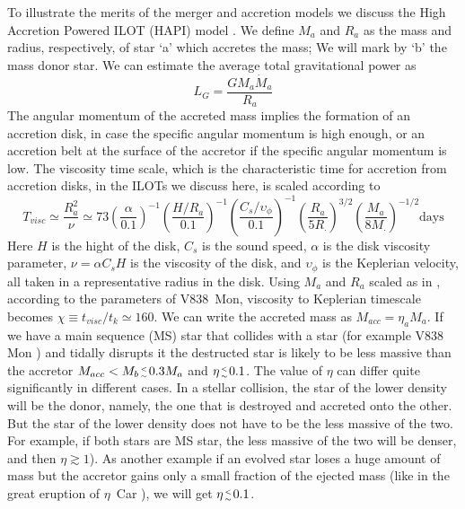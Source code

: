 \documentclass[a4paper,modern]{aastex62}
\newcommand{\lesim}{\genfrac{}{}{0pt}{2}{<}{\sim}}
\begin{document}
To illustrate the merits of the merger and accretion models we discuss the High Accretion Powered ILOT (HAPI) model \citep{2016RAA....16...99K}.
We define $M_a$ and $R_a$ as the mass and radius, respectively, of star `a’ which accretes the mass; We will mark by `b’ the mass donor star.
We can estimate the average total gravitational power as
\begin{equation} 
L_G=\frac{ G M_a \dot M_a }{R_a}
\end{equation}
The angular momentum of the accreted mass implies the formation of an accretion disk, in case the specific angular momentum is high enough, or an accretion belt at the surface of the accretor if the specific angular momentum is low.
The viscosity time scale, which is the characteristic time for accretion from accretion disks, in the ILOTs we discuss here, is scaled according to
\begin{equation} 
T_{visc}\simeq \frac{R^2_a}{\nu} \simeq 73 \left(\frac{\alpha}{0.1}\right)^{-1} \left(\frac{H/R_a}{0.1}\right)^{-1} \left(\frac{C_s/\upsilon_\phi}{0.1}\right) ^{-1} \left(\frac{R_a}{5R_\cdot}\right)^{3/2} \left(\frac{M_a}{8M_\cdot}\right)^{-1/2} \text{days}
\end{equation}
Here $H$ is the hight of the disk, $C_s$ is the sound speed, $\alpha$ is the disk viscosity parameter, $\nu=\alpha C_s H$ is the viscosity of the disk, and $\upsilon_\phi$ is the Keplerian velocity, all taken in a representative radius in the disk. 
Using $M_a$ and $R_a$ scaled as in \cite{2005A&A...441.1099T}, according to the parameters of V838~Mon, viscosity to Keplerian timescale becomes $\chi \equiv t_{visc}/t_k\simeq 160$. 
We can write the accreted mass as $M_{acc}=\eta_a M_a$.
If we have a main sequence (MS) star that collides with a star (for example V838 Mon \cite{2006A&A...451..223T}) and tidally disrupts it the destructed star is likely to be less massive than the accretor $M_{acc} < M_b \lesim 0.3M_a$ and $\eta\lesim 0.1$.
The value of $\eta$ can differ quite significantly in different cases.
In a stellar collision, the star of the lower density will be the donor, namely, the one that is destroyed and accreted onto the other. But the star of the lower density does not have to be the less massive of the two.
For example, if both stars are MS star, the less massive of the two will be denser, and then  $\eta \gtrsim 1$). 
As another example if an evolved star loses a huge amount of mass but the accretor gains only a small fraction of the ejected mass (like in the great eruption of $\eta$~Car \cite{2008NewA...13..569K}), we will get $\eta\lesim 0.1$. 
\end{document}
